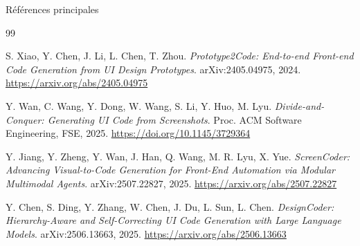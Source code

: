 \documentclass[aspectratio=169,11pt]{beamer}
\begin{document}
\begin{frame}{Références principales}
\footnotesize
\begin{thebibliography}{99}

S. Xiao, Y. Chen, J. Li, L. Chen, T. Zhou.
\newblock \emph{Prototype2Code: End-to-end Front-end Code Generation from UI Design Prototypes}.
\newblock arXiv:2405.04975, 2024.
\newblock \url{https://arxiv.org/abs/2405.04975}

Y. Wan, C. Wang, Y. Dong, W. Wang, S. Li, Y. Huo, M. Lyu.
\newblock \emph{Divide-and-Conquer: Generating UI Code from Screenshots}.
\newblock Proc. ACM Software Engineering, FSE, 2025.
\newblock \url{https://doi.org/10.1145/3729364}



Y. Jiang, Y. Zheng, Y. Wan, J. Han, Q. Wang, M. R. Lyu, X. Yue.
\newblock \emph{ScreenCoder: Advancing Visual-to-Code Generation for Front-End Automation via Modular Multimodal Agents}.
\newblock arXiv:2507.22827, 2025.
\newblock \url{https://arxiv.org/abs/2507.22827}

Y. Chen, S. Ding, Y. Zhang, W. Chen, J. Du, L. Sun, L. Chen.
\newblock \emph{DesignCoder: Hierarchy-Aware and Self-Correcting UI Code Generation with Large Language Models}.
\newblock arXiv:2506.13663, 2025.
\newblock \url{https://arxiv.org/abs/2506.13663}

\end{thebibliography}
\end{frame}
\end{document}
